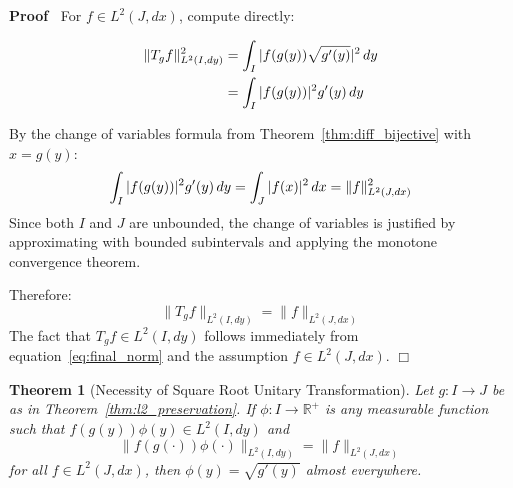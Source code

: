 \documentclass{article}
\newenvironment{proof}{\noindent\textbf{Proof\ }}{\hspace*{\fill}$\Box$\medskip}
\newtheorem{theorem}{Theorem}
\begin{document}
\begin{proof}
  For $f \in L^2 (J, dx)$, compute directly:
  
  \begin{align}
    \|T_g f\|_{L^2 (I, dy)}^2 & = \int_I |f (g (y)) \sqrt{g' (y)} |^2 
    \hspace{0.17em} dy  \label{eq:norm_calc1}\\
    & = \int_I |f (g (y)) |^2 g' (y)  \hspace{0.17em} dy 
    \label{eq:norm_calc2}
  \end{align}
  
  By the change of variables formula from Theorem~\ref{thm:diff_bijective}
  with $x = g (y)$:
  \begin{equation}
    \label{eq:change_vars_apply} \int_I |f (g (y)) |^2 g' (y) \hspace{0.17em}
    dy = \int_J |f (x) |^2  \hspace{0.17em} dx = \|f\|_{L^2 (J, dx)}^2
  \end{equation}
  Since both $I$ and $J$ are unbounded, the change of variables is justified
  by approximating with bounded subintervals and applying the monotone
  convergence theorem.
  
  Therefore:
  \begin{equation}
    \label{eq:final_norm} \|T_g f\|_{L^2 (I, dy)} = \|f\|_{L^2 (J, dx)}
  \end{equation}
  The fact that $T_g f \in L^2 (I, dy)$ follows immediately from
  equation~\eqref{eq:final_norm} and the assumption $f \in L^2 (J, dx)$.
\end{proof}

\begin{theorem}[Necessity of Square Root Unitary Transformation]
  \label{thm:necessity}Let $g : I \to J$ be as in
  Theorem~\ref{thm:l2_preservation}. If $\phi : I \to \mathbb{R}^+$ is any
  measurable function such that $f (g (y)) \phi (y) \in L^2 (I, dy)$ and
  \begin{equation}
    \label{eq:general_norm} \|f (g (\cdot)) \phi (\cdot)\|_{L^2 (I, dy)} =
    \|f\|_{L^2 (J, dx)}
  \end{equation}
  for all $f \in L^2 (J, dx)$, then $\phi (y) = \sqrt{g' (y)}$ almost
  everywhere.
\end{theorem}
\end{document}
